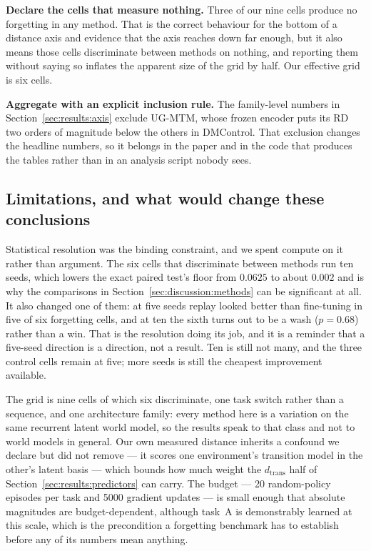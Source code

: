 \textbf{Declare the cells that measure nothing.} Three of our nine cells produce
no forgetting in any method. That is the correct behaviour for the bottom of a
distance axis and evidence that the axis reaches down far enough, but it also
means those cells discriminate between methods on nothing, and reporting them
without saying so inflates the apparent size of the grid by half. Our effective
grid is six cells.

\textbf{Aggregate with an explicit inclusion rule.} The family-level numbers in
Section~\ref{sec:results:axis} exclude UG-MTM, whose frozen encoder puts its RD
two orders of magnitude below the others in DMControl. That exclusion changes the
headline numbers, so it belongs in the paper and in the code that produces the
tables rather than in an analysis script nobody sees.

\subsection{Limitations, and what would change these conclusions}
\label{sec:discussion:limitations}

Statistical resolution was the binding constraint, and we spent compute on it
rather than argument. The six cells that discriminate between methods run ten
seeds, which lowers the exact paired test's floor from $0.0625$ to about
$0.002$ and is why the comparisons in Section~\ref{sec:discussion:methods} can
be significant at all. It also changed one of them: at five seeds replay looked
better than fine-tuning in five of six forgetting cells, and at ten the sixth
turns out to be a wash ($p = 0.68$) rather than a win. That is the resolution
doing its job, and it is a reminder that a five-seed direction is a direction,
not a result. Ten is still not many, and the three control cells remain at
five; more seeds is still the cheapest improvement available.

The grid is nine cells of which six discriminate, one task switch rather than a
sequence, and one architecture family: every method here is a variation on the
same recurrent latent world model, so the results speak to that class and not to
world models in general. Our own measured distance inherits a confound we
declare but did not remove --- it scores one environment's transition model in
the other's latent basis --- which bounds how much weight the
$d_{\mathrm{trans}}$ half of Section~\ref{sec:results:predictors} can carry. The
budget --- 20 random-policy episodes per task and
5000 gradient updates --- is small enough that absolute magnitudes are
budget-dependent, although task~A is demonstrably learned at this scale, which is
the precondition a forgetting benchmark has to establish before any of its
numbers mean anything.

